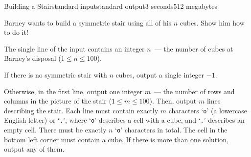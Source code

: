\begin{problem}{Building a Stair}{standard input}{standard output}{3 seconds}{512 megabytes}
\vspace*{-5pt}

Barney wants to build a symmetric stair using all of his $n$ cubes. Show him how to do it!

\InputFile
The single line of the input contains an integer $n$~--- the number of cubes at Barney's disposal ($1 \le n \le 100$).

\OutputFile
If there is no symmetric stair with $n$ cubes, output a single integer $-1$.

Otherwise, in the first line, output one integer $m$~--- the number of rows and columns in the picture of the stair ($1 \le m \le 100$). Then, output $m$ lines describing the stair. Each line must contain exactly $m$ characters `\texttt{o}' (a lowercase English letter) or `\texttt{.}', where `\texttt{o}' describes a cell with a cube, and `\texttt{.}' describes an empty cell. There must be exactly $n$ `\texttt{o}' characters in total. The cell in the bottom left corner must contain a cube. If there is more than one solution, output any of them.


\Examples

\begin{example}
%
%
\end{example}

\end{problem}

